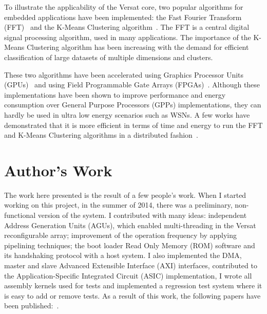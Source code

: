 To illustrate the applicability of the Versat core, two popular
algorithms for embedded applications have been implemented: the Fast
Fourier Transform (FFT)~\cite{jcer17} and the K-Means Clustering
algorithm~\cite{fpl17}. The FFT is a central digital signal processing
algorithm, used in many applications. The importance of the K-Means
Clustering algorithm has been increasing with the demand for efficient
classification of large datasets of multiple dimensions and clusters.

These two algorithms have been accelerated using Graphics Processor
Units (GPUs)~\cite{moreland2003fft,doggettfft,Che07,farivar2008} and
using Field Programmable Gate Arrays
(FPGAs)~\cite{chao2005design,sun2008design,derafshi2010high,Liu2005,hussain2011,kutty2013}. Although
these implementations have been shown to improve performance and
energy consumption over General Purpose Processors (GPPs)
implementations, they can hardly be used in ultra low energy scenarios
such as WSNs. A few works have demonstrated that it is more efficient
in terms of time and energy to run the FFT and K-Means Clustering
algorithms in a distributed
fashion~\cite{canli2006power,Sasikumar2012,xu2012power}.

\section{Author's Work}
\label{section:authorWork}

The work here presented is the result of a few people's work. When I
started working on this project, in the summer of 2014, there was a
preliminary, non-functional version of the system. I contributed with
many ideas: independent Address Generation Units (AGUs), which enabled
multi-threading in the Versat reconfigurable array; improvement of the
operation frequency by applying pipelining techniques; the boot loader
Read Only Memory (ROM) software and its handshaking protocol with a
host system. I also implemented the DMA, master and slave Advanced
Extensible Interface (AXI) interfaces, contributed to the
Application-Specific Integrated Circuit (ASIC) implementation, I wrote
all assembly kernels used for tests and implemented a regression test
system where it is easy to add or remove tests. As a result of this
work, the following papers have been
published:~\cite{deSousa16,vecparBook16,jcer16,rec17,fpl17,jcer17}.

